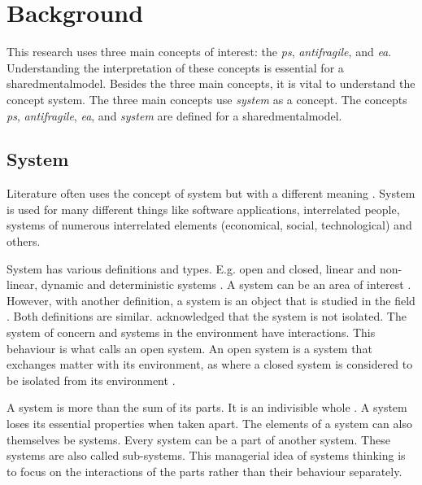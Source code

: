 \chapter{Background}
\label{ch:theoreticalbackground}
This research uses three main concepts of interest: the \textit{\gls{ps}}, \textit{\gls{antifragile}}, and \textit{\gls{ea}}. Understanding the interpretation of these concepts is essential for a \gls{sharedmentalmodel}. Besides the three main concepts, it is vital to understand the concept system. The three main concepts use \textit{system} as a concept. The concepts \textit{\gls{ps}}, \textit{\gls{antifragile}}, \textit{\gls{ea}}, and \textit{system} are defined for a \gls{sharedmentalmodel}.
\section{System}
\label{sec:tbsystem}
Literature often uses the concept of system but with a different meaning \parencite[p.~37]{Lapalme2012}. System is used for many different things like software applications, interrelated people, systems of numerous interrelated elements (economical, social, technological) and others.

System has various definitions and types. E.g. open and closed, linear and non-linear, dynamic and deterministic systems \parencite{Rickles2007}. A system can be an area of interest \parencite[p.~13]{Mannaert2016}. However, with another definition, a system is an object that is studied in the field \parencite[p.~933]{Rickles2007}. Both definitions are similar. \Textcite[pp.~13--14]{Mannaert2016} acknowledged that the system is not isolated. The system of concern and systems in the environment have interactions. This behaviour is what \textcite[p.~32]{Bertalanffy1968} calls an open system. An open system is a system that exchanges matter with its environment, as where a closed system is considered to be isolated from its environment \parencite[p.~39]{Bertalanffy1968}.

A system is more than the sum of its parts. It is an indivisible whole \parencites[p.~51--69]{Ackoff1964}[p.~664]{Ackoff1973}. A system loses its essential properties when taken apart. The elements of a system can also themselves be systems. Every system can be a part of another system. These systems are also called sub-systems. This managerial idea of systems thinking is to focus on the interactions of the parts rather than their behaviour separately. 

